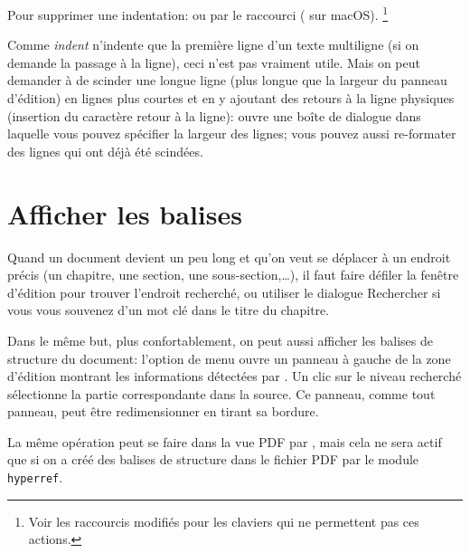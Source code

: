 Pour supprimer une indentation: \submenu{} ou par le raccourci \keysequence{Ctrl+[} (\keysequence{Cmd+[} sur macOS). \footnote{Voir les raccourcis modifiés pour les claviers qui ne permettent pas ces actions.}

Comme \textsl{indent} n'indente que la première ligne d'un texte multiligne (si on demande la passage à la ligne), ceci n'est pas vraiment utile. Mais on peut demander à \Tw{} de scinder une longue ligne (plus longue que la largeur du panneau d'édition) en lignes plus courtes et en y ajoutant des retours à la ligne physiques (insertion du caractère retour à la ligne): \emph{\submenu{}} ouvre une boîte de dialogue dans laquelle vous pouvez spécifier la largeur des lignes; vous pouvez aussi re-formater des lignes qui ont déjà été scindées.
%

\section{Afficher les balises}

Quand un document devient un peu long et qu'on veut se déplacer à un endroit précis (un chapitre, une section, une sous-section,\dots), il faut faire défiler la fenêtre d'édition pour trouver l'endroit recherché, ou utiliser le dialogue Rechercher si vous vous souvenez d'un mot clé dans le titre du chapitre.

Dans le même but, plus confortablement, on peut aussi afficher les balises de structure du document: l'option de menu \submenu{}\submenu{} ouvre  un panneau à gauche de la zone d'édition montrant les informations détectées par \Tw. Un clic sur le niveau recherché sélectionne la partie correspondante dans la source. Ce panneau, comme tout panneau, peut être redimensionner en tirant sa bordure.


La même opération peut se faire dans la vue PDF par \submenu{}\submenu{}, mais cela ne sera actif que si on a créé des balises de structure dans le fichier PDF par le module \verb|hyperref|.

